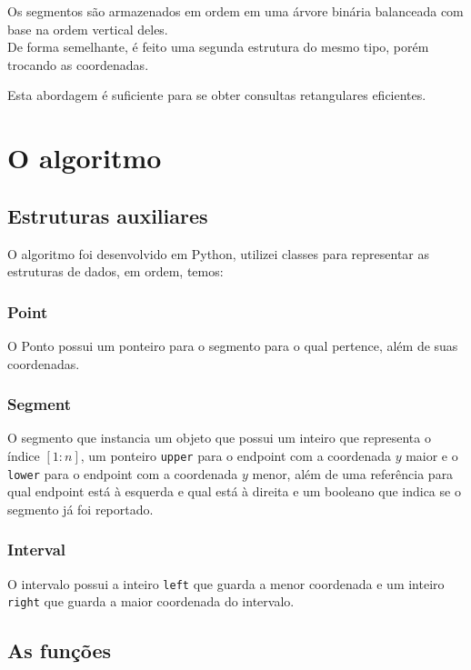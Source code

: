 \documentclass{article}
\theoremstyle{definition}
\begin{document}
Os segmentos são armazenados em ordem em uma árvore binária balanceada 
com base na ordem vertical deles.\\
De forma semelhante, é feito uma segunda estrutura do mesmo tipo, porém 
trocando as coordenadas.

\hspace*{15pt} Esta abordagem é suficiente para se obter consultas retangulares eficientes.

\section{O algoritmo}
\subsection{Estruturas auxiliares}
\hspace*{15pt} O algoritmo foi desenvolvido em Python, utilizei classes 
para representar as estruturas de dados, em ordem, temos:
\subsubsection*{Point}
\hspace*{15pt}O Ponto possui um ponteiro para o segmento para o qual 
pertence, além de suas coordenadas. 

\subsubsection*{Segment}
\hspace*{15pt}O segmento que instancia um objeto que possui um inteiro
que representa o índice $[1:n]$, um ponteiro \texttt{upper}
para o endpoint com a coordenada $y$ maior e o \texttt{lower} para
o endpoint com a coordenada $y$ menor, além de uma referência para
qual endpoint está à esquerda e qual está à direita e um booleano
que indica se o segmento já foi reportado.

\subsubsection*{Interval}
\hspace*{15pt} O intervalo possui a inteiro \texttt{left} que guarda
a menor coordenada e um inteiro \texttt{right} que guarda a maior
coordenada do intervalo.



\subsection{As funções}
\end{document}

